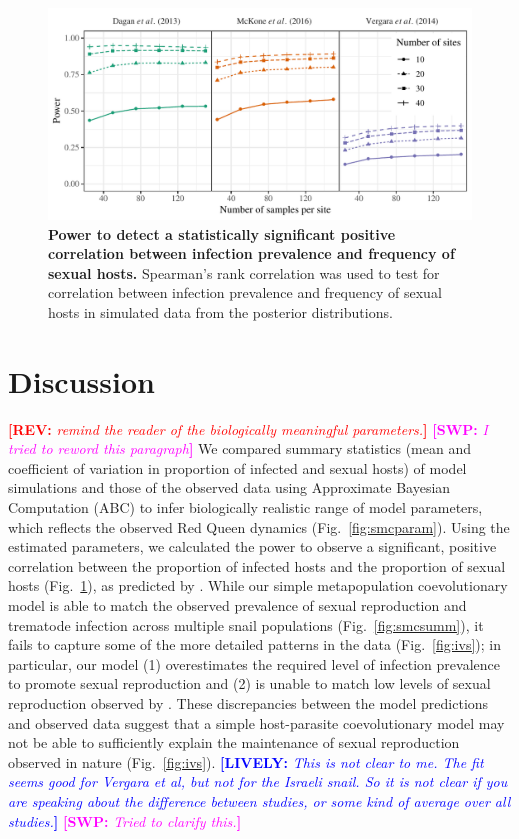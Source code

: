 \documentclass{article}\usepackage[]{graphicx}\usepackage[]{color}
\newcommand{\comment}[3]{\textcolor{#1}{\textbf{[#2: }\textit{#3}\textbf{]}}}
\newcommand{\swp}[1]{\comment{magenta}{SWP}{#1}}
\newcommand{\rev}[1]{\comment{red}{REV}{#1}}
\newcommand{\lively}[1]{\comment{blue}{LIVELY}{#1}}
\newcommand{\fref}[1]{Fig.~\ref{fig:#1}}
\begin{document}
\begin{figure}[!ht]
\includegraphics[width=\textwidth]{../fig/power.pdf}
\caption{{\bf Power to detect a statistically significant positive correlation between infection prevalence and frequency of sexual hosts.}
Spearman's rank correlation was used to test for correlation between infection prevalence and frequency of sexual hosts in simulated data from the posterior distributions.
}
\label{fig:power}
\end{figure}

\section{Discussion}

\rev{remind the reader of the biologically meaningful parameters.}
\swp{I tried to reword this paragraph}
We compared summary statistics (mean and coefficient of variation in proportion of infected
and sexual hosts) of model simulations and those of the observed 
data using Approximate Bayesian Computation (ABC) to infer biologically realistic 
range of model parameters, which reflects the observed Red Queen dynamics (\fref{smcparam}).
Using the estimated parameters, we calculated the power to observe a significant,
positive correlation between the proportion of infected hosts and the proportion 
of sexual hosts (\fref{power}), as predicted by \cite{lively1992parthenogenesis}.
While our simple metapopulation coevolutionary model is able to match 
the observed prevalence of sexual reproduction and trematode infection 
across multiple snail populations (\fref{smcsumm}),
it fails to capture some of the more detailed patterns in the data (\fref{ivs});
in particular, our model (1) overestimates the required level of infection prevalence
to promote sexual reproduction and (2) is unable to match low levels of sexual reproduction 
observed by \cite{dagan2013clonal}.
These discrepancies between the model predictions and observed data suggest that a 
simple host-parasite coevolutionary model may not be able to sufficiently explain 
the maintenance of sexual reproduction observed in nature (\fref{ivs}).
\lively{This is not clear to me.  The fit seems good for Vergara et al, but not
for the Israeli snail.  So it is not clear if you are speaking about the 
difference between studies, or some kind of average over all studies.}
\swp{Tried to clarify this.}
\end{document}
